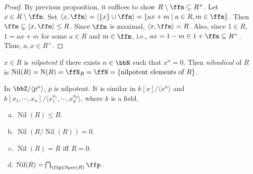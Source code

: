 \begin{proof}
    By previous proposition, it suffices to show $R \setminus \ffm \subseteq R^\times$. Let $x \in R \setminus \ffm$. Set $\langle x, \ffm \rangle = \langle \{x\} \cup \ffm \rangle = \{ax+m \mid a \in R, m \in \ffm\}$. Then $\ffm \subsetneq \langle x, \ffm \rangle \leq R$. Since $\ffm$ is maximal, $\langle x,\ffm \rangle = R$. Also, since $1 \in R$, $1 = ax + m$ for some $a \in R$ and $m \in \ffm$, i.e., $ax = 1-m \in 1 + \ffm \subseteq R^\times$. Thus, $a,x \in R^\times$.
\end{proof}

\begin{definition}
    $x \in R$ is \emph{nilpotent} if there exists $n \in \bbN$ such that $x^n = 0$. Then \emph{nilradical} of $R$ is $\operatorname{Nil}(R) = \operatorname{N}(R) = \ffN_R = \ffN = \{\text{nilpotent elements of }R\}$.
\end{definition}

\begin{example}
    In $\bbZ/\langle p^n \rangle$, $\overline p$ is nilpotent. It is similar in $k[x]/\langle x^n \rangle$ and $k[x_1,\cdots,x_n]/\langle x_1^{a_1},\cdots,x_d^{a_d}\rangle$, where $k$ is a field.
\end{example}

\begin{proposition}
    \begin{enumerate}[(a)]
        \item $\operatorname{Nil}(R) \leq R$.
        \item $\operatorname{Nil}(R/\operatorname{Nil}(R)) = 0$.
        \item $\operatorname{Nil}(R) = R$ iff $R = 0$.
        \item $\operatorname{Nil}(R) = \bigcap_{\ffp \in \operatorname{Spec}(R)}\ffp$.
    \end{enumerate}
\end{proposition}

